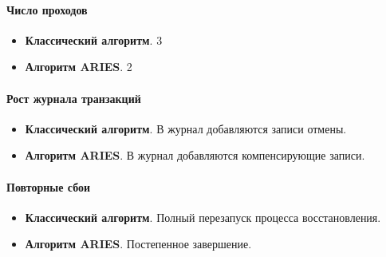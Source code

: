 \paragraph{Число проходов}

\begin{itemize}
    \item \textbf{Классический алгоритм}. 3
    \item \textbf{Алгоритм ARIES}. 2
\end{itemize}

\paragraph{Рост журнала транзакций}

\begin{itemize}
    \item \textbf{Классический алгоритм}. В журнал добавляются записи отмены.
    \item \textbf{Алгоритм ARIES}. В журнал добавляются компенсирующие записи.
\end{itemize}

\paragraph{Повторные сбои}

\begin{itemize}
    \item \textbf{Классический алгоритм}. Полный перезапуск процесса восстановления.
    \item \textbf{Алгоритм ARIES}. Постепенное завершение.
\end{itemize}

